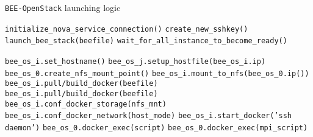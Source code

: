 \begin{algorithm}
\caption{\texttt{BEE-OpenStack} launching logic}
\label{bee-openstack}
\begin{algorithmic}[1]
\STATE \texttt{initialize\_nova\_service\_connection()}
\STATE \texttt{create\_new\_sshkey()}
\STATE \texttt{launch\_bee\_stack(\texttt{beefile})}
\STATE \texttt{wait\_for\_all\_instance\_to\_become\_ready()}

\STATE \texttt{bee\_os\_i.set\_hostname()}
\STATE \texttt{bee\_os\_j.setup\_hostfile(bee\_os\_i.ip)}
\ENDFOR
\ENDFOR
\STATE \texttt{bee\_os\_0.create\_nfs\_mount\_point()}
\STATE \texttt{bee\_os\_i.mount\_to\_nfs(bee\_os\_0.ip())}
\ENDFOR
{}
\STATE \texttt{bee\_os\_i.pull/build\_docker(beefile)}
\ENDFOR
{}
\STATE \texttt{bee\_os\_i.pull/build\_docker(beefile)}
\STATE \texttt{bee\_os\_i.conf\_docker\_storage(nfs\_mnt)}
\STATE \texttt{bee\_os\_i.conf\_docker\_network(host\_mode)}
\STATE \texttt{bee\_os\_i.start\_docker('ssh daemon')}
\ENDFOR
{}
\STATE \texttt{bee\_os\_0.docker\_exec(script)}
\ENDFOR
{}
\STATE \texttt{bee\_os\_0.docker\_exec(mpi\_script)}
\ENDFOR
\end{algorithmic}
\end{algorithm}